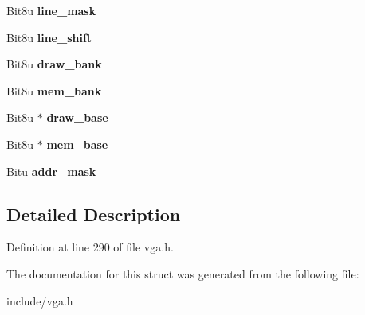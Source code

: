 \begin{DoxyCompactItemize}
\item 
\hypertarget{structVGA__TANDY_ac11ab0eacb74d36a4a3dd6aaf37a686f}{Bit8u {\bfseries line\-\_\-mask}}\label{structVGA__TANDY_ac11ab0eacb74d36a4a3dd6aaf37a686f}

\item 
\hypertarget{structVGA__TANDY_ae12c0fcf6c249e111c6234f01b8cf248}{Bit8u {\bfseries line\-\_\-shift}}\label{structVGA__TANDY_ae12c0fcf6c249e111c6234f01b8cf248}

\item 
\hypertarget{structVGA__TANDY_a5b6d47ade55349d0a33eb63e54395287}{Bit8u {\bfseries draw\-\_\-bank}}\label{structVGA__TANDY_a5b6d47ade55349d0a33eb63e54395287}

\item 
\hypertarget{structVGA__TANDY_a7387ac0d3b061d599ce1afe53910beef}{Bit8u {\bfseries mem\-\_\-bank}}\label{structVGA__TANDY_a7387ac0d3b061d599ce1afe53910beef}

\item 
\hypertarget{structVGA__TANDY_a3e2211caf88d83cc8288bed2fa5fa0af}{Bit8u $\ast$ {\bfseries draw\-\_\-base}}\label{structVGA__TANDY_a3e2211caf88d83cc8288bed2fa5fa0af}

\item 
\hypertarget{structVGA__TANDY_a5e9ff0bd5345f4fb3e7e9e6e5bd2ccad}{Bit8u $\ast$ {\bfseries mem\-\_\-base}}\label{structVGA__TANDY_a5e9ff0bd5345f4fb3e7e9e6e5bd2ccad}

\item 
\hypertarget{structVGA__TANDY_a844355a014b601bccd7728ccc140935e}{Bitu {\bfseries addr\-\_\-mask}}\label{structVGA__TANDY_a844355a014b601bccd7728ccc140935e}

\end{DoxyCompactItemize}


\subsection{Detailed Description}


Definition at line 290 of file vga.\-h.



The documentation for this struct was generated from the following file\-:\begin{DoxyCompactItemize}
\item 
include/vga.\-h\end{DoxyCompactItemize}
